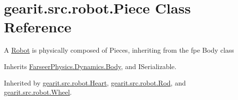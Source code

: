 \hypertarget{classgearit_1_1src_1_1robot_1_1_piece}{\section{gearit.\+src.\+robot.\+Piece Class Reference}
\label{classgearit_1_1src_1_1robot_1_1_piece}
}


A \hyperlink{classgearit_1_1src_1_1robot_1_1_robot}{Robot} is physically composed of Pieces, inheriting from the fpe Body class  




Inherits \hyperlink{class_farseer_physics_1_1_dynamics_1_1_body}{Farseer\+Physics.\+Dynamics.\+Body}, and I\+Serializable.



Inherited by \hyperlink{classgearit_1_1src_1_1robot_1_1_heart}{gearit.\+src.\+robot.\+Heart}, \hyperlink{classgearit_1_1src_1_1robot_1_1_rod}{gearit.\+src.\+robot.\+Rod}, and \hyperlink{classgearit_1_1src_1_1robot_1_1_wheel}{gearit.\+src.\+robot.\+Wheel}.

